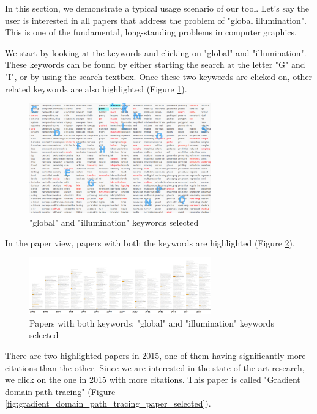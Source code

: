 In this section, we demonstrate a typical usage scenario of our tool. Let's say the user is interested in all papers that address the problem of "global illumination". This is one of the fundamental, long-standing problems in computer graphics.

We start by looking at the keywords and clicking on "global" and "illumination". These keywords can be found by either starting the search at the letter "G" and "I", or by using the search textbox. Once these two keywords are clicked on, other related keywords are also highlighted (Figure \ref{fig:global_illumination_selected}).

\begin{figure}[ht]			
    \centering
    \includegraphics[width=0.7\textwidth]{global_illumination_clicked.png}
    \caption{"global" and "illumination" keywords selected}
    \label{fig:global_illumination_selected}
\end{figure}

In the paper view, papers with both the keywords are highlighted (Figure \ref{fig:global_illumination_papers}).

\begin{figure}[ht]			
    \centering
    \includegraphics[width=0.7\textwidth]{global_illumination_papers.png}
    \caption{Papers with both keywords: "global" and "illumination" keywords selected}
    \label{fig:global_illumination_papers}
\end{figure}

There are two highlighted papers in 2015, one of them having significantly more citations than the other. Since we are interested in the state-of-the-art research, we click on the one in 2015 with more citations. This paper is called "Gradient domain path tracing" (Figure \ref{fig:gradient_domain_path_tracing_paper_selected}).

